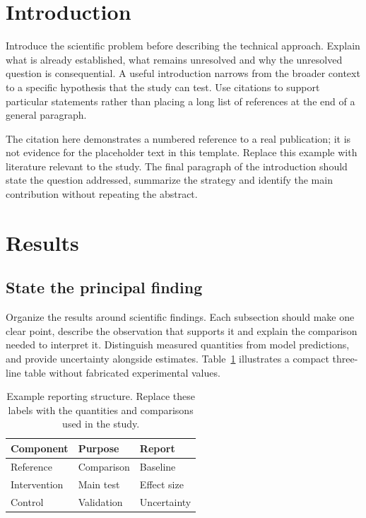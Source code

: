 \section{Introduction}
Introduce the scientific problem before describing the technical approach.
Explain what is already established, what remains unresolved and why the
unresolved question is consequential. A useful introduction narrows from the
broader context to a specific hypothesis that the study can test. Use citations
to support particular statements rather than placing a long list of references
at the end of a general paragraph.

The citation here demonstrates a numbered reference to a real publication; it
is not evidence for the placeholder text in this template.\cite{shannon1948}
Replace this example with literature relevant to the study. The final paragraph
of the introduction should state the question addressed, summarize the strategy
and identify the main contribution without repeating the abstract.

\section{Results}
\subsection{State the principal finding}
Organize the results around scientific findings. Each subsection should make
one clear point, describe the observation that supports it and explain the
comparison needed to interpret it. Distinguish measured quantities from model
predictions, and provide uncertainty alongside estimates. Table~\ref{tab:design}
illustrates a compact three-line table without fabricated experimental values.

\begin{table}[htbp]
  \caption{Example reporting structure. Replace these labels with the quantities
    and comparisons used in the study.}
  \label{tab:design}
  \centering\small
  \begin{tabular*}{\linewidth}{@{\extracolsep{\fill}}lll@{}}
    \toprule
    Component & Purpose & Report \\
    \midrule
    Reference & Comparison & Baseline \\
    Intervention & Main test & Effect size \\
    Control & Validation & Uncertainty \\
    \bottomrule
  \end{tabular*}
\end{table}

